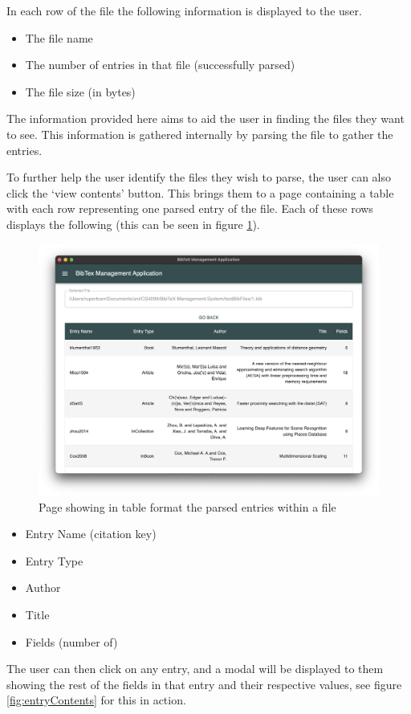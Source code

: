 \documentclass[a4paper,11pt]{article}
\begin{document}
In each row of the file the following information is displayed to the user.
\begin{itemize}
    \item The file name
    \item The number of entries in that file (successfully parsed)
    \item The file size (in bytes)
\end{itemize}
The information provided here aims to aid the user in finding the files they want to see. This information is gathered internally by parsing the file to gather the entries.

To further help the user identify the files they wish to parse, the user can also click the `view contents' button. This brings them to a page containing a table with each row representing one parsed entry of the file. Each of these rows displays the following (this can be seen in figure \ref{fig:fileEntries}).

\begin{figure}
    \centering
    \includegraphics[width=0.8\linewidth]{images/fileEntries.png}
    \caption{Page showing in table format the parsed entries within a file}
    \label{fig:fileEntries}
\end{figure}

\begin{itemize}
    \item Entry Name (citation key)
    \item Entry Type
    \item Author
    \item Title
    \item Fields (number of)
\end{itemize}
The user can then click on any entry, and a modal will be displayed to them showing the rest of the fields in that entry and their respective values, see figure \ref{fig:entryContents} for this in action.
\end{document}
